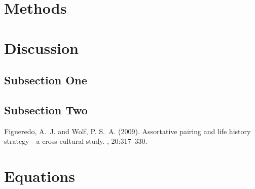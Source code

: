 \documentclass[twoside,twocolumn]{article}
\begin{document}

    
    

    
    \section{Methods}

    
    \section{Discussion}
    
    \subsection{Subsection One}
        
    \subsection{Subsection Two}
    
    
    
    \begin{thebibliography}{99} %
    
    Figueredo, A.~J. and Wolf, P. S.~A. (2009).
    \newblock Assortative pairing and life history strategy - a cross-cultural
      study.
    , 20:317--330.
    \section{Equations}

    \end{thebibliography}
    
    
    
\end{document}

